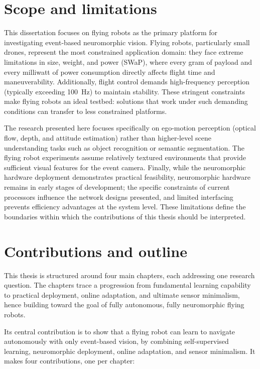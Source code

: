 \section{Scope and limitations}

This dissertation focuses on flying robots as the primary platform for investigating event-based neuromorphic vision. Flying robots, particularly small drones, represent the most constrained application domain: they face extreme limitations in size, weight, and power (SWaP), where every gram of payload and every milliwatt of power consumption directly affects flight time and maneuverability. Additionally, flight control demands high-frequency perception (typically exceeding 100~Hz) to maintain stability. These stringent constraints make flying robots an ideal testbed: solutions that work under such demanding conditions can transfer to less constrained platforms.

The research presented here focuses specifically on ego-motion perception (optical flow, depth, and attitude estimation) rather than higher-level scene understanding tasks such as object recognition or semantic segmentation. The flying robot experiments assume relatively textured environments that provide sufficient visual features for the event camera. Finally, while the neuromorphic hardware deployment demonstrates practical feasibility, neuromorphic hardware remains in early stages of development; the specific constraints of current processors influence the network designs presented, and limited interfacing prevents efficiency advantages at the system level. These limitations define the boundaries within which the contributions of this thesis should be interpreted.


\section{Contributions and outline}

This thesis is structured around four main chapters, each addressing one research question. The chapters trace a progression from fundamental learning capability to practical deployment, online adaptation, and ultimate sensor minimalism, hence building toward the goal of fully autonomous, fully neuromorphic flying robots.

Its central contribution is to show that a flying robot can learn to navigate autonomously with only event-based vision, by combining self-supervised learning, neuromorphic deployment, online adaptation, and sensor minimalism. It makes four contributions, one per chapter:

